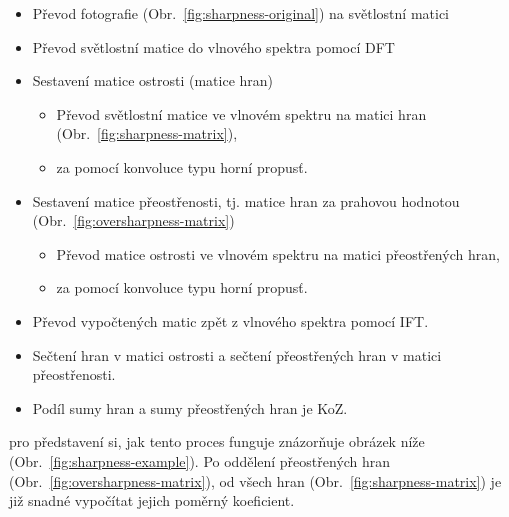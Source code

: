 \begin{itemize}
	\setlength{\parskip}{0pt}
	\setlength{\itemsep}{0pt}
	\item{Převod fotografie (Obr.~\ref{fig:sharpness-original}) na světlostní matici}
	\item{Převod světlostní matice do vlnového spektra pomocí DFT}
	\item{Sestavení matice ostrosti (matice hran)}
	\begin{itemize}
		\setlength{\parskip}{0pt}
		\setlength{\itemsep}{0pt}
		\item {Převod světlostní matice ve vlnovém spektru na matici hran (Obr.~\ref{fig:sharpness-matrix}),}
		\item {za pomocí konvoluce typu horní propusť.}
	\end{itemize}
	\item{Sestavení matice přeostřenosti, tj. matice hran za prahovou hodnotou (Obr.~\ref{fig:oversharpness-matrix})}
	\begin{itemize}
		\setlength{\parskip}{0pt}
		\setlength{\itemsep}{0pt}
		\item {Převod matice ostrosti ve vlnovém spektru na matici přeostřených hran,}
		\item {za pomocí konvoluce typu horní propusť.}
	\end{itemize}
	\item{Převod vypočtených matic zpět z vlnového spektra pomocí IFT.}
	\item{Sečtení hran v matici ostrosti a sečtení přeostřených hran v matici přeostřenosti.}
	\item{Podíl sumy hran a sumy přeostřených hran je KoZ.}
\end{itemize}

pro představení si, jak tento proces funguje znázorňuje obrázek níže (Obr.~\ref{fig:sharpness-example}). Po oddělení přeostřených hran (Obr.~\ref{fig:oversharpness-matrix}), od všech hran (Obr.~\ref{fig:sharpness-matrix}) je již snadné vypočítat jejich poměrný koeficient.

